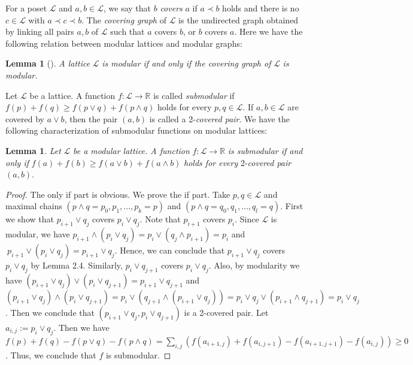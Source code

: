 \documentclass[11pt]{article}
\theoremstyle{definition}
\newtheorem{lemma}[theorem]{Lemma}
\begin{document}
For a poset $\mathcal{L}$ and $a,b\in \mathcal{L}$, we say that $b$ \textit{covers} $a$ if $a\prec b$ holds and there is no $c\in \mathcal{L}$ with $a\prec c\prec b$. The \textit{covering graph} of $\mathcal{L}$ is the undirected graph obtained by linking all pairs $a,b$ of $\mathcal{L}$ such that $a$ covers $b$, or $b$ covers $a$. Here we have the following relation between modular lattices and modular graphs:
\begin{lemma}[\cite{vel1993}]
\label{modular}
\textit{A lattice }$\mathcal{L}$ \textit{is modular if and only if the covering graph of} $\mathcal{L}$ \textit{is modular.}
\end{lemma}

Let $\mathcal{L}$ be a lattice. A function $f:\mathcal{L}\rightarrow \mathbb{R}$ is called \textit{submodular} if $f(p)+f(q)\geq f(p\vee q)+f(p\wedge q)$ holds for every $p,q\in \mathcal{L}$. If $a,b\in \mathcal{L}$ are covered by $a\vee b$, then the pair $(a,b)$ is called a 2-\textit{covered pair}. We have the following characterization of submodular functions on modular lattices:
\begin{lemma}
\label{submodular}
\textit{Let} $\mathcal{L}$ \textit{be a modular lattice. A function} $f:\mathcal{L}\rightarrow \mathbb{R}$ \textit{is submodular if and only if} $f(a)+f(b)\geq f(a\vee b)+f(a\wedge b)$ \textit{holds for every} 2-\textit{covered pair} $(a,b)$.
\end{lemma}
\begin{proof}
The only if part is obvious. We prove the if part. Take $p,q\in \mathcal{L}$ and maximal chains $(p\wedge q=p_0,p_1,\ldots,p_k=p)$ and $(p\wedge q=q_0,q_1,\ldots,q_l=q)$. First we show that $p_{i+1}\vee q_j$ covers $p_i\vee q_j$. Note that $p_{i+1}$ covers $p_i$. Since $\mathcal{L}$ is modular, we have $p_{i+1}\wedge (p_i\vee q_{j})=p_i\vee (q_j\wedge p_{i+1})=p_i$ and$\ p_{i+1}\vee (p_i\vee q_{j})=p_{i+1}\vee q_j$. Hence, we can conclude that $p_{i+1}\vee q_j$ covers $p_i\vee q_j$ by Lemma 2.4. Similarly, $p_i\vee q_{j+1}$ covers $p_i\vee q_j$. Also, by modularity we have $(p_{i+1}\vee q_j)\vee (p_i\vee q_{j+1})=p_{i+1}\vee q_{j+1}$ and $(p_{i+1}\vee q_j)\wedge (p_i\vee q_{j+1})=p_i\vee (q_{j+1}\wedge (p_{i+1}\vee q_j))=p_i\vee q_j\vee (p_{i+1}\wedge q_{j+1})=p_{i}\vee q_{j}$. Then we conclude that $(p_{i+1}\vee q_j,p_i\vee q_{j+1})$ is a 2-covered pair. Let $a_{i,j}:=p_i\vee q_j$. Then we have $f(p)+f(q)-f(p\vee q)-f(p\wedge q)=\sum_{i,j}(f(a_{i+1,j})+f(a_{i,j+1})-f(a_{i+1,j+1})-f(a_{i,j}))\geq 0$. Thus, we conclude that $f$ is submodular.
\end{proof}
\end{document}
